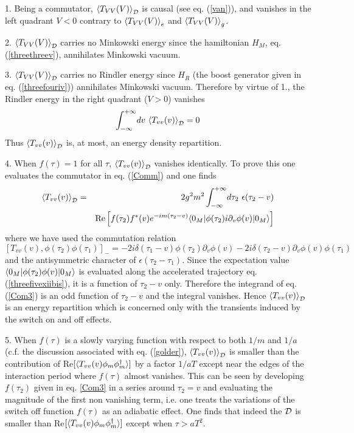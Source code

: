 \documentclass[12pt]{article}
\begin{document}
1. Being a commutator, $\bk{T_{VV}(V)}_{{\cal D}}$ is causal (see
eq. (\ref{van})), and vanishes
in the left quadrant $V<0$ contrary to $\mbox{$ \langle T_{VV}(V) \rangle $}_{e}$ and
$\mbox{$ \langle T_{VV}(V) \rangle $}_{g}$.

2. $\bk{T_{VV}(V)}_{{\cal D}}$ carries no Minkowski energy since
 the hamiltonian $H_M$, eq. (\ref{threethreev}), annihilates Minkowski vacuum.

3. $\bk{T_{VV}(V)}_{{\cal D}}$ carries no Rindler energy since
$H_R$ (the boost generator given in eq. (\ref{threefouriv})) annihilates
Minkowski vacuum.
Therefore by virtue of 1.,
the Rindler energy in the right quadrant ($V>0$) vanishes
\begin{equation}
\int_{-\infty}^{+\infty} \! dv\ \bk{T_{vv}(v)}_{{\cal D}} =0
\label{Com2}
\end{equation}
Thus $\bk{T_{vv}(v)}_{{\cal D}}$ is, at most, an energy density repartition.

4. When $f(\tau)=1$ for all $\tau$, $\bk{T_{vv}(v)}_{{\cal D}}$ vanishes
identically.
To prove
this one evaluates
the commutator in eq. (\ref{Comm}) and one finds
\begin{eqnarray}
\bk{T_{vv}(v)}_{{\cal D}}&=& 2g^2 m^2
\int_{-\infty}^{+\infty} \! d\tau_2\
\epsilon(\tau_2 - v) \nonumber\\
&& \mbox{Re} \left[ f(\tau_2)   f^*(v)
e^{-i m( \tau_2 -v)}
\bra{0_M} \phi(\tau_2) i\partial_v \phi(v) \ket{0_M}
\right]
\label{Com3}
\end{eqnarray}
where we have used the commutation relation
\begin{equation}
\left[T_{vv}(v), \phi(\tau_2)\phi(\tau_1) \right]_- =
-2i \delta(\tau_1 -v)
\phi(\tau_2)
\partial_v \phi(v)
-2i \delta(\tau_2 -v)
\partial_v \phi(v)
\phi(\tau_1)
\label{Com4}
\end{equation}
and the antisymmetric character of $\epsilon(\tau_2 - \tau_1)$.
Since the expectation value $\mbox{$ \langle 0_M \vert $} \phi(\tau_2)\phi(v) \mbox{$ \vert 0_M \rangle $}$ is
evaluated along the
accelerated trajectory eq. (\ref{threefivexiibis}),
it is a function of $\tau_2-v$ only. Therefore
the integrand of eq. (\ref{Com3}) is an odd function of $\tau_2-v$
and the integral vanishes.
Hence $\bk{T_{vv}(v)}_{{\cal D}}$ is
an energy repartition which is concerned only with
the transients induced by the switch on and off effects.

5. When $f(\tau)$ is a slowly varying function with respect to
both $1/m$ and $1/a$ (c.f. the discussion associated with eq. (\ref{golder}),
$\bk{T_{vv}(v)}_{{\cal D}}$ is smaller than the contribution of
Re$[\mbox{$ \langle T_{vv}(v)\phi_m\phi_m^\dagger \rangle $}]$ by a factor $1/aT$ except
near the edges of the interaction period where $f(\tau)$ almost
vanishes.
This can be seen by developing $f(\tau_2)$ given in eq. \ref{Com3} in a series
around $\tau_2 =v$ and evaluating the magnitude of the first non vanishing
term, i.e. one
treats the variations of the
switch off function $f(\tau)$ as an adiabatic effect.
One finds that indeed the $\cal{D}$ is smaller than
Re$[\mbox{$ \langle T_{vv}(v)\phi_m\phi_m^\dagger \rangle $}]$ except when $\tau > aT^2$.
\end{document}
